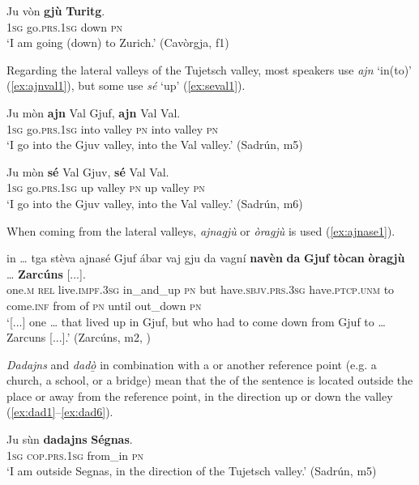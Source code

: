 \ea
\label{ex:gjuturitg1}
\gll  Ju vòn \textbf{gjù} \textbf{Turitg}.\footnotemark\\
\textsc{1sg} go.\textsc{prs.1sg} down \textsc{pn}\\
\glt `I am going (down) to Zurich.'  (Cavòrgja, f1)
\z

Regarding the lateral valleys of the Tujetsch valley, most speakers use \textit{ajn} `in(to)' (\ref{ex:ajnval1}), but some use \textit{sé} `up' (\ref{ex:seval1}).

\ea
\label{ex:ajnval1}
\gll Ju mòn \textbf{ajn} Val Gjuf, \textbf{ajn} Val Val.\\
\textsc{1sg} go.\textsc{prs.1sg} into valley \textsc{pn} into valley \textsc{pn}\\
\glt `I go into the Gjuv valley, into the Val valley.' (Sadrún, m5)
\z

\ea
\label{ex:seval1}
\gll Ju mòn \textbf{sé} Val Gjuv, \textbf{sé} Val Val.\\
\textsc{1sg} go.\textsc{prs.1sg} up valley \textsc{pn} up valley \textsc{pn}\\
\glt `I go into the Gjuv valley, into the Val valley.' (Sadrún, m6)
\z

When coming from the lateral valleys, \textit{ajnagjù} or \textit{òragjù} is used (\ref{ex:ajnase1}).

\ea
\label{ex:ajnase1}
\gll [...] in … tga stèva ajnasé Gjuf ábar vaj gju da vagní \textbf{navèn} \textbf{da} \textbf{Gjuf} \textbf{tòcan} \textbf{òragjù} … \textbf{Zarcúns}  [...].\\
{} one.\textsc{m} {} \textsc{rel} live.\textsc{impf.3sg} in\_and\_up \textsc{pn} but  have.\textsc{sbjv.prs.3sg} have.\textsc{ptcp.unm} to come.\textsc{inf} from of \textsc{pn} until out\_down {} \textsc{pn} \\
\glt `[...] one … that lived up in Gjuf, but who had to come down from Gjuf to … Zarcuns [...].' (Zarcúns, m2, )
\z

\textit{Dadajns} and \textit{dadò̱} in combination with a  or another reference point (e.g. a church, a school, or a bridge) mean that the  of the sentence is located outside the place or away from the reference point, in the direction up or down the valley (\ref{ex:dad1}--\ref{ex:dad6}).

\ea
\label{ex:dad1}
\gll Ju sùn \textbf{dadajns} \textbf{Ségnas}.\\
\textsc{1sg} \textsc{cop.prs.1sg} from\_in \textsc{pn}\\
\glt `I am outside Segnas, in the direction of the Tujetsch valley.' (Sadrún, m5)
\z

